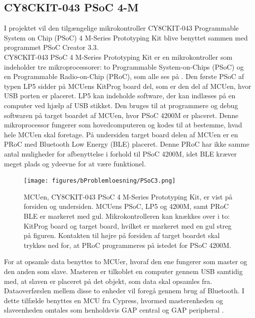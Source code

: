\subsection{CY8CKIT-043 PSoC 4-M}
I projektet vil den tilgængelige mikrokontroller CY8CKIT-043 Programmable System on Chip (PSoC) 4 M-Series Prototyping Kit blive benyttet sammen med programmet PSoC Creator 3.3.\\
CY8CKIT-043 PSoC 4 M-Series Prototyping Kit er en mikrokontroller som indeholder tre mikroprocessorer: to Programmable System-on-Chips (PSoC) og en Programmable Radio-on-Chip (PRoC), som alle ses på . Den første PSoC af typen LP5 sidder på MCUens KitProg board del, som er den del af MCUen, hvor USB porten er placeret. LP5 kan indeholde software, der kan indlæses på en computer ved hjælp af USB stikket. Den bruges til at programmere og debug softwaren på target boardet af MCUen, hvor PSoC 4200M er placeret. %
Denne mikroprocessor fungerer som hovedcomputeren og kodes til at bestemme, hvad hele MCUen skal foretage. %
På undersiden target board delen af MCUen er en PRoC med Bluetooth Low Energy (BLE) placeret. Denne PRoC har ikke samme antal muligheder for afbenyttelse i forhold til PSoC 4200M, idet BLE kræver meget plads og ydeevne for at være funktionel. \citep{CYPRESS2016PSoC,Semiconductor2016,CYPRESS2016Cortexm0}
\begin{figure}[H]
	\centering
	\texttt{[image: figures/bProblemloesning/PSoC3.png]}
	\caption{MCUen, CY8CKIT-043 PSoC 4 M-Series Prototyping Kit, er vist på forsiden og undersiden. MCUens PSoC, LP5 og 4200M, samt PRoC BLE er markeret med gul. Mikrokontrolleren kan knækkes over i to: KitProg board og target board, hvilket er markeret med en gul streg på figuren. Kontakten til højre på forsiden af target boardet skal trykkes ned for, at PRoC programmeres på istedet for PSoC 4200M. \citep{CYPRESS2016PSoC,Semiconductor2016}}
	\label{fig:PSoC}
\end{figure}\vspace{-0.2cm}
For at opsamle data benyttes to MCUer, hvoraf den ene fungerer som master og den anden som slave. Masteren er tilkoblet en computer gennem USB samtidig med, at slaven er placeret på det objekt, som data skal opsamles fra. Dataoverførslen mellem disse to enheder vil foregå gennem brug af Bluetooth. I dette tilfælde benyttes en MCU fra Cypress, hvormed masterenheden og slaveenheden omtales som henholdsvis GAP central og GAP peripheral \citep{Luthra2015}.

